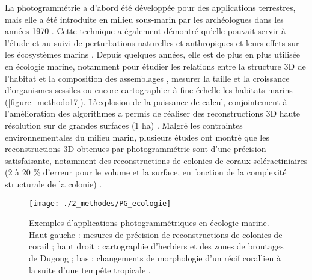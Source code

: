 La photogrammétrie a d’abord été développée pour des applications terrestres, mais elle a été introduite en milieu sous-marin par les archéologues dans les années 1970 \citep{pollio_applications_1968, drap_underwater_2012}. Cette technique a également démontré qu’elle pouvait servir à l’étude et au suivi de perturbations naturelles et anthropiques et leurs effets sur les écosystèmes marins \citep{burns_assessing_2016}. Depuis quelques années, elle est de plus en plus utilisée en écologie marine, notamment pour étudier les relations entre la structure 3D de l’habitat et la composition des assemblages \citep{agudo-adriani_colony_2016, darling_relationships_2017, burns_3d_2019, price_using_2019, carlot_community_2020}, mesurer la taille et la croissance d’organismes sessiles \citep{abdo_efficiently_2006, holmes_estimating_2008, figueira_accuracy_2015,gutierrez-heredia_simple_2015,lavy_quick_2015} ou encore cartographier à fine échelle les habitats marins \citep{casella_mapping_2017, mizuno_simple_2017} (\autoref{figure_methodo17}). L’explosion de la puissance de calcul, conjointement à l’amélioration des algorithmes a permis de réaliser des reconstructions 3D haute résolution sur de grandes surfaces (1 ha) \citep{friedman_multi-scale_2012,gonzalez-rivero_catlin_2014,leon_measuring_2015}. Malgré les contraintes environnementales du milieu marin, plusieurs études ont montré que les reconstructions 3D obtenues par photogrammétrie sont d’une précision satisfaisante, notamment des reconstructions de colonies de coraux scléractiniaires (2 à 20 \% d’erreur pour le volume et la surface, en fonction de la complexité structurale de la colonie) \citep{courtney_estimating_2007, figueira_accuracy_2015,lavy_quick_2015,gutierrez-heredia_end_2016}.

\begin{figure}[H]
	\begin{center}
	\texttt{[image: ./2\_methodes/PG\_ecologie]}
		\caption[Exemples d’applications photogrammétriques en écologie marine]{Exemples d’applications photogrammétriques en écologie marine. Haut gauche : mesures de précision de reconstructions de colonies de corail \citep{figueira_accuracy_2015} ; haut droit : cartographie d’herbiers et des zones de broutages de Dugong \citep{mizuno_simple_2017} ; bas : changements de morphologie d’un récif corallien à la suite d'une tempête tropicale \citep{burns_assessing_2016}.}
	\label{figure_methodo17}
\end{center}
\end{figure}